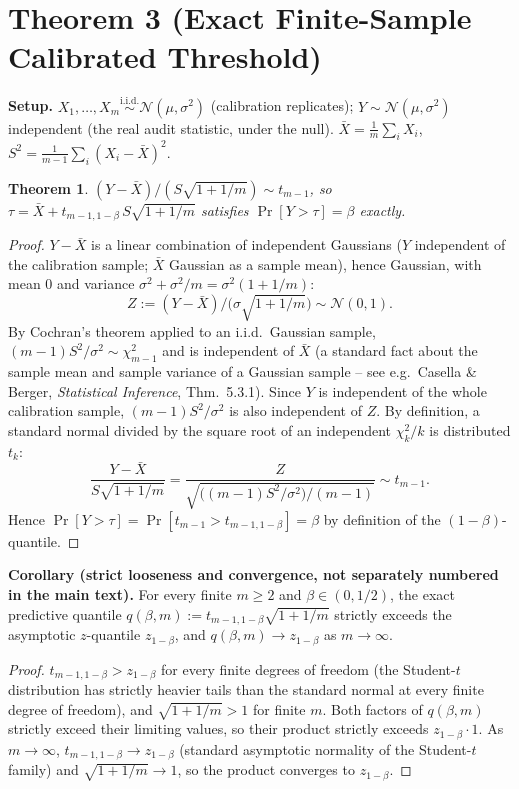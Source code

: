 \documentclass[10pt,journal,compsoc]{IEEEtran}
\newtheorem{theorem}{Theorem}
\begin{document}
\section*{Theorem 3 (Exact Finite-Sample Calibrated Threshold)}

\textbf{Setup.} $X_1,\ldots,X_m \stackrel{\text{i.i.d.}}{\sim} \mathcal{N}(\mu,\sigma^2)$ (calibration replicates); $Y \sim \mathcal{N}(\mu,\sigma^2)$ independent (the real audit statistic, under the null). $\bar X = \tfrac{1}{m}\sum_i X_i$, $S^2 = \tfrac{1}{m-1}\sum_i (X_i-\bar X)^2$.

\begin{theorem}
$(Y-\bar X)/(S\sqrt{1+1/m}) \sim t_{m-1}$, so $\tau = \bar X + t_{m-1,1-\beta}\, S\sqrt{1+1/m}$ satisfies $\Pr[Y>\tau]=\beta$ exactly.
\end{theorem}

\begin{proof}
$Y-\bar X$ is a linear combination of independent Gaussians ($Y$ independent of the calibration sample; $\bar X$ Gaussian as a sample mean), hence Gaussian, with mean $0$ and variance $\sigma^2 + \sigma^2/m = \sigma^2(1+1/m)$:
\[
Z := (Y-\bar X)\big/\bigl(\sigma\sqrt{1+1/m}\bigr) \sim \mathcal{N}(0,1).
\]
By Cochran's theorem applied to an i.i.d.\ Gaussian sample, $(m-1)S^2/\sigma^2 \sim \chi^2_{m-1}$ and is independent of $\bar X$ (a standard fact about the sample mean and sample variance of a Gaussian sample -- see e.g.\ Casella \& Berger, \emph{Statistical Inference}, Thm.\ 5.3.1). Since $Y$ is independent of the whole calibration sample, $(m-1)S^2/\sigma^2$ is also independent of $Z$. By definition, a standard normal divided by the square root of an independent $\chi^2_k/k$ is distributed $t_k$:
\[
\frac{Y-\bar X}{S\sqrt{1+1/m}} = \frac{Z}{\sqrt{\bigl((m-1)S^2/\sigma^2\bigr)/(m-1)}} \sim t_{m-1}.
\]
Hence $\Pr[Y>\tau] = \Pr[t_{m-1} > t_{m-1,1-\beta}] = \beta$ by definition of the $(1-\beta)$-quantile.
\end{proof}

\noindent \textbf{Corollary (strict looseness and convergence, not separately numbered in the main text).} For every finite $m \ge 2$ and $\beta \in (0,1/2)$, the exact predictive quantile $q(\beta,m) := t_{m-1,1-\beta}\sqrt{1+1/m}$ strictly exceeds the asymptotic $z$-quantile $z_{1-\beta}$, and $q(\beta,m) \to z_{1-\beta}$ as $m\to\infty$.

\begin{proof}
$t_{m-1,1-\beta} > z_{1-\beta}$ for every finite degrees of freedom (the Student-$t$ distribution has strictly heavier tails than the standard normal at every finite degree of freedom), and $\sqrt{1+1/m} > 1$ for finite $m$. Both factors of $q(\beta,m)$ strictly exceed their limiting values, so their product strictly exceeds $z_{1-\beta}\cdot 1$. As $m\to\infty$, $t_{m-1,1-\beta}\to z_{1-\beta}$ (standard asymptotic normality of the Student-$t$ family) and $\sqrt{1+1/m}\to 1$, so the product converges to $z_{1-\beta}$.
\end{proof}
\end{document}
